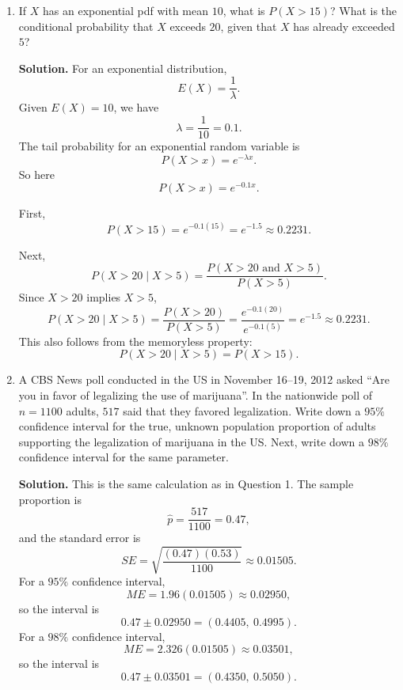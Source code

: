 \documentclass[12pt]{article}
\begin{document}
\begin{enumerate}[label=(\arabic*), leftmargin=*]
\begin{enumerate}[label=(\alph*)]
    \item
    \[
    P(\bar X\le 3.9)=P\left(Z\le \frac{3.9-4.5}{0.2}\right)=P(Z\le -3).
    \]
    From the table,
    \[
    P(Z\le -3)=0.0013.
    \]

    \item
    \[
    P(4.2<\bar X<4.8)=P\left(\frac{4.2-4.5}{0.2}<Z<\frac{4.8-4.5}{0.2}\right)=P(-1.5<Z<1.5).
    \]
    Since $P(Z<1.5)=0.9332$ and $P(Z<-1.5)=0.0668$,
    \[
    P(-1.5<Z<1.5)=0.9332-0.0668=0.8664.
    \]

    \item
    \[
    P(\bar X>4.5)=P\left(Z>\frac{4.5-4.5}{0.2}\right)=P(Z>0)=0.5.
    \]
\end{enumerate}

\item If $X$ has an exponential pdf with mean $10$, what is $P(X>15)$? What is the conditional probability that $X$ exceeds $20$, given that $X$ has already exceeded $5$?

\par\medskip
\noindent\textbf{Solution.}
For an exponential distribution,
\[
E(X)=\frac{1}{\lambda}.
\]
Given $E(X)=10$, we have
\[
\lambda=\frac{1}{10}=0.1.
\]
The tail probability for an exponential random variable is
\[
P(X>x)=e^{-\lambda x}.
\]
So here
\[
P(X>x)=e^{-0.1x}.
\]

First,
\[
P(X>15)=e^{-0.1(15)}=e^{-1.5}\approx 0.2231.
\]

Next,
\[
P(X>20\mid X>5)=\frac{P(X>20\text{ and }X>5)}{P(X>5)}.
\]
Since $X>20$ implies $X>5$,
\[
P(X>20\mid X>5)=\frac{P(X>20)}{P(X>5)}=\frac{e^{-0.1(20)}}{e^{-0.1(5)}}=e^{-1.5}\approx 0.2231.
\]
This also follows from the memoryless property:
\[
P(X>20\mid X>5)=P(X>15).
\]

\item A CBS News poll conducted in the US in November 16--19, 2012 asked ``Are you in favor of legalizing the use of marijuana''. In the nationwide poll of $n=1100$ adults, $517$ said that they favored legalization. Write down a $95\%$ confidence interval for the true, unknown population proportion of adults supporting the legalization of marijuana in the US. Next, write down a $98\%$ confidence interval for the same parameter.

\par\medskip
\noindent\textbf{Solution.}
This is the same calculation as in Question 1.
The sample proportion is
\[
\hat p=\frac{517}{1100}=0.47,
\]
and the standard error is
\[
SE=\sqrt{\frac{(0.47)(0.53)}{1100}}\approx 0.01505.
\]
For a $95\%$ confidence interval,
\[
ME=1.96(0.01505)\approx 0.02950,
\]
so the interval is
\[
0.47\pm 0.02950=(0.4405,\ 0.4995).
\]
For a $98\%$ confidence interval,
\[
ME=2.326(0.01505)\approx 0.03501,
\]
so the interval is
\[
0.47\pm 0.03501=(0.4350,\ 0.5050).
\]


\end{enumerate}
\end{document}
